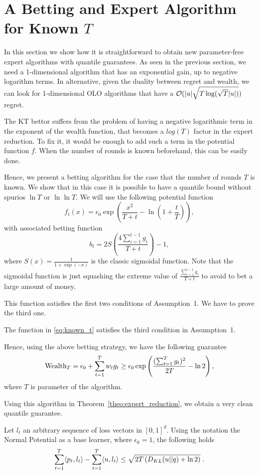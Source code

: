 \section{A Betting and Expert Algorithm for Known $T$}

In this section we show how it is straightforward to obtain new parameter-free expert algorithms with quantile guarantees.
As seen in the previous section, we need a 1-dimensional algorithm that has an exponential gain, up to negative logarithm terms. In alternative, given the duality between regret and wealth, we can look for 1-dimensional \ac{OLO} algorithms that have a $\mathcal{O}(|u|\sqrt{T \log(\sqrt{T} |u|)})$ regret.

The \ac{KT} bettor suffers from the problem of having a negative logarithmic term in the exponent of the wealth function, that becomes a $log(T)$ factor in the expert reduction.
To fix it, it would be enough to add such a term in the potential function $f$. When the number of rounds is known beforehand, this can be easily done.

Hence, we present a betting algorithm for the case that the number of rounds $T$ is known. We show that in this case it is possible to have a quantile bound without spurios $\ln T$ or $\ln \ln T$.
We will use the following potential function
\begin{equation}
\label{eq:known_t}
f_t(x)=\epsilon_0 \exp\left(\frac{x^2}{T+t}-\ln\left(1+\frac{t}{T}\right)\right),
\end{equation}
with associated betting function
\[
b_t=2 S\left(\frac{4 \sum_{i=1}^{t-1} g_i}{T+t}\right)-1,
\]
where $S(x)=\frac{1}{1+\exp(-x)}$ is the classic sigmoidal function. Note that the sigmoidal function is just squashing the extreme value of
$\frac{\sum_{i=1}^{t-1} g_i}{T+t}$ to avoid to bet a large amount of money.

This function satisfies the first two conditions of Assumption~1.
We have to prove the third one.

\begin{theorem}
\label{theo:known_t}
The function in \eqref{eq:known_t} satisfies the third condition in Assumption~1.
\end{theorem}


Hence, using the above betting strategy, we have the following guarantee
\[
\operatorname{Wealth}_T = \epsilon_0 + \sum_{t=1}^T w_t g_t \geq \epsilon_0 \exp\left( \frac{(\sum_{t=1}^T g_t)^2}{2 T} - \ln 2\right),
\]
where $T$ is parameter of the algorithm.

Using this algorithm in Theorem~\ref{theo:expert_reduction}, we obtain a very clean quantile guarantee.
\begin{cor}
\label{cor:kt_expert}
Let $l_t$ an arbitrary sequence of loss vectors in $[0,1]^d$. Using the notation the Normal Potential as a base learner, where $\epsilon_0=1$, the following holds
\[
\sum_{t=1}^T \langle p_t, l_t\rangle -\sum_{t=1}^T \langle u , l_t\rangle 
\leq \sqrt{2 T \left(D_{KL}(u||q) +\ln 2 \right)} \; .
\]
\end{cor}
